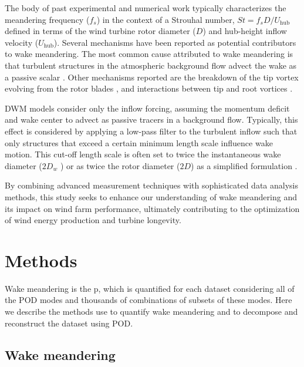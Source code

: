\documentclass[%
 aip,
 amsmath,
 amssymb,
preprint,%
]{revtex4-2}
\begin{document}
The body of past experimental and numerical work typically characterizes the meandering frequency ($f_s$) in the context of a Strouhal number, $St = f_s D/U_\text{hub}$ defined in terms of the wind turbine rotor diameter ($D$) and hub-height inflow velocity ($U_\text{hub}$). 
Several mechanisms have been reported as potential contributors to wake meandering. 
The most common cause attributed to wake meandering is that turbulent structures in the atmospheric background flow advect the wake as a passive scalar \cite{baker1985wake, zambrano1983wake, larsen2007dynamic, larsen2008wake, jonkman2017development}. 
Other mechanisms reported are the breakdown of the tip vortex evolving from the rotor blades \cite{medici2008measurements, okulov2007stability, okulov2014regular}, and interactions between tip and root vortices \cite{howard2015statistics, foti2016wake, foti2018wake}.

DWM models \cite{larsen2008wake} consider only the inflow forcing, assuming the momentum deficit and wake center to advect as passive tracers in a background flow. 
Typically, this effect is considered by applying a low-pass filter to the turbulent inflow such that only structures that exceed a certain minimum length scale influence wake motion. 
This cut-off length scale is often set to twice the instantaneous wake diameter ($2D_w$ \cite{larsen2008wake, jonkman2017development}) or as twice the rotor diameter ($2D$) as a simplified formulation \cite{shaler2019fast, shaler2019effects}.

By combining advanced measurement techniques with sophisticated data analysis methods, this study seeks to enhance our understanding of wake meandering and its impact on wind farm performance, ultimately contributing to the optimization of wind energy production and turbine longevity.



\section{Methods}
\label{sec:methods}

Wake meandering is the p, which is quantified for each dataset considering all of the POD modes and thousands of combinations of subsets of these modes. Here we describe the methods use to quantify wake meandering and to decompose and reconstruct the dataset using POD.

\subsection{Wake meandering}
\label{sec:meander}
\end{document}
